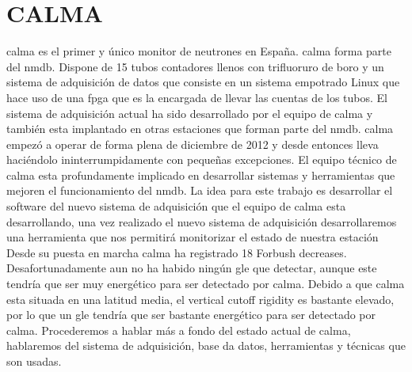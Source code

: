 \section{CALMA}
	\gls{calma} es el primer y único monitor de neutrones en España. \gls{calma} forma parte del \gls{nmdb}. Dispone de 15 tubos contadores llenos con trifluoruro 
	de boro y un sistema de adquisición de datos que consiste en un sistema empotrado Linux que hace uso de una \gls{fpga} que es la encargada de 
	llevar las cuentas de los tubos. El sistema de adquisición actual ha sido desarrollado por el equipo de \gls{calma} y también esta implantado en 
	otras estaciones que forman parte del \gls{nmdb}. \gls{calma} empezó a operar de forma plena de diciembre de 2012 y desde entonces lleva haciéndolo 
	ininterrumpidamente con pequeñas excepciones. El equipo técnico de  \gls{calma} esta profundamente implicado en desarrollar sistemas y herramientas 
	que mejoren el funcionamiento del \gls{nmdb}. La idea para este trabajo es desarrollar el software del nuevo sistema de adquisición que el equipo 
	de \gls{calma} esta desarrollando, una vez realizado el nuevo sistema de adquisición desarrollaremos una herramienta que nos permitirá monitorizar 
	el estado de nuestra estación
	Desde su puesta en marcha \gls{calma} ha registrado 18 Forbush decreases. Desafortunadamente aun no ha habido ningún \gls{gle} que detectar, aunque este
	tendría que ser muy energético para ser detectado por \gls{calma}. Debido a que \gls{calma} esta situada en una latitud media, el vertical cutoff rigidity
	es bastante elevado, por lo que un \gls{gle} tendría que ser bastante energético para ser detectado por \gls{calma}. 
	Procederemos a hablar más a fondo del estado actual de \gls{calma}, hablaremos del sistema de adquisición, base da datos, herramientas y técnicas
	que son usadas.
